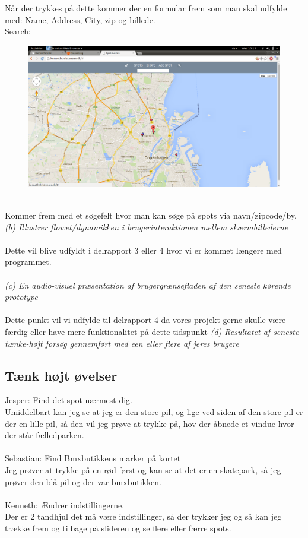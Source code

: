 \documentclass[12pt]{article}
\begin{document}
Når der trykkes på dette kommer der en formular frem som man skal udfylde med: Name, Address, City, zip og billede.\\
\pagebreak
Search: 
\begin{figure}[h]
\includegraphics[scale = 0.21]{Search}
\end{figure}\\
Kommer frem med et søgefelt hvor man kan søge på spots via navn/zipcode/by.\\

\textit{(b) Illustrer flowet/dynamikken i brugerinteraktionen mellem skærmbillederne}\\\\
Dette vil blive udfyldt i delrapport 3 eller 4 hvor vi er kommet længere med programmet.\\\\
\textit{(c) En audio-visuel præsentation af brugergrænsefladen af den seneste kørende prototype}\\\\
Dette punkt vil vi udfylde til delrapport 4 da vores projekt gerne skulle være færdig eller have mere funktionalitet på dette tidspunkt
\newpage
\textit{(d) Resultatet af seneste tænke-højt forsøg gennemført med een eller flere af jeres brugere}
\subsection*{Tænk højt øvelser}
Jesper: Find det spot nærmest dig.\\
Umiddelbart kan jeg se at jeg er den store pil, og lige ved siden af den store pil er der en lille pil, så den vil jeg prøve at trykke på, hov der åbnede et vindue hvor der står fælledparken.\\\\
Sebastian: Find Bmxbutikkens marker på kortet\\
Jeg prøver at trykke på en rød først og kan se at det er en skatepark, så jeg prøver den blå pil og der var bmxbutikken.\\\\
Kenneth: Ændrer indstillingerne.\\
Der er 2 tandhjul det må være indstillinger, så der trykker jeg og så kan jeg trække frem og tilbage på slideren og se flere eller færre spots.\\\\
\end{document}
